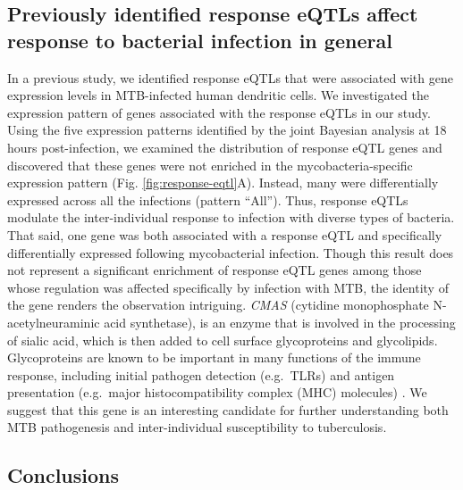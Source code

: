 \subsection{Previously identified response eQTLs affect response to
bacterial infection in
general}\label{previously-identified-response-eqtls-affect-response-to-bacterial-infection-in-general}

In a previous study, we identified response eQTLs that were associated
with gene expression levels in MTB-infected human dendritic cells. We
investigated the expression pattern of genes associated with the
response eQTLs in our study. Using the five expression patterns
identified by the joint Bayesian analysis at 18 hours post-infection,
we examined the distribution of response eQTL genes and discovered
that these genes were not enriched in the mycobacteria-specific
expression pattern (Fig. \ref{fig:response-eqtl}A). Instead, many were
differentially expressed across all the infections (pattern
``All''). Thus, response eQTLs modulate the inter-individual response
to infection with diverse types of bacteria.  That said, one gene was
both associated with a response eQTL and specifically differentially
expressed following mycobacterial infection.  Though this result does
not represent a significant enrichment of response eQTL genes among
those whose regulation was affected specifically by infection with
MTB, the identity of the gene renders the observation
intriguing. \emph{CMAS} (cytidine monophosphate N-acetylneuraminic
acid synthetase), is an enzyme that is involved in the processing of
sialic acid, which is then added to cell surface glycoproteins and
glycolipids. Glycoproteins are known to be important in many functions
of the immune response, including initial pathogen detection
(e.g.~TLRs) and antigen presentation (e.g.~major histocompatibility
complex (MHC) molecules) \citep{Wolfert2013, Johnson2013,
  Crespo2013}. We suggest that this gene is an interesting candidate
for further understanding both MTB pathogenesis and inter-individual
susceptibility to tuberculosis.

\subsection{Conclusions}\label{ch02-conclusions}

